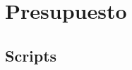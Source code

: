 \documentclass[spanish,a4paper,12pt,oneside]{extreport}
\begin{document}


\newpage{\pagestyle{empty}}
\thispagestyle{empty}

\chapter{\LARGE Presupuesto}
\label{chapter:presupuesto}



\newpage{\pagestyle{empty}\cleardoublepage}
\thispagestyle{empty}

\begin{appendix}
\chapter{\LARGE Scripts}
\label{appendix:1}

\label{appendix:2}

\label{appendix:3}

\end{appendix}




\end{document}
